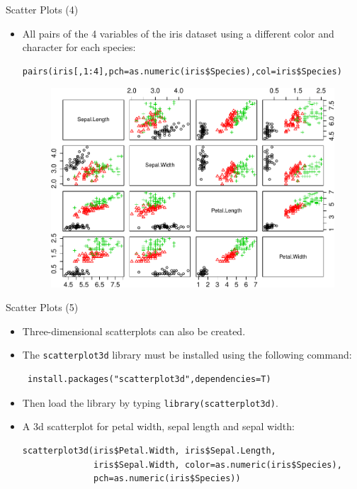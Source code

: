 \documentclass[handout]{beamer}
\begin{document}
\begin{frame}[fragile]{Scatter Plots (4)}
\scriptsize{
\begin{itemize}
 \item All pairs of the 4 variables of the iris dataset using a different color and character for each species:
 \begin{verbatim}
pairs(iris[,1:4],pch=as.numeric(iris$Species),col=iris$Species)
 \end{verbatim}

  \begin{figure}[h!]
	\centering
	\includegraphics[scale=0.5]{pics/scatter2.pdf}		
\end{figure} 
 
 
\end{itemize}

}
 
\end{frame}


\begin{frame}[fragile]{Scatter Plots (5)}
\scriptsize{
\begin{itemize}
 \item Three-dimensional scatterplots can also be created.
 \item The \verb+scatterplot3d+ library must be installed using the following command:
 
 \begin{verbatim}
 install.packages("scatterplot3d",dependencies=T)
 \end{verbatim}
 
 \item Then load the library by typing \verb+library(scatterplot3d)+.
 
 \item A 3d scatterplot for petal width, sepal length and sepal width:
 \begin{verbatim}
scatterplot3d(iris$Petal.Width, iris$Sepal.Length, 
              iris$Sepal.Width, color=as.numeric(iris$Species),
              pch=as.numeric(iris$Species))  
 \end{verbatim}

 
  
\end{itemize}




}
 
\end{frame}
\end{document}
